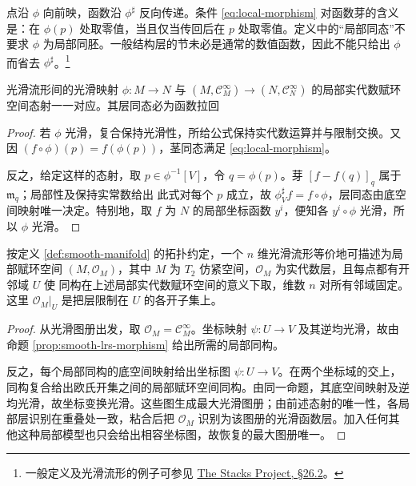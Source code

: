 点沿 $\phi$ 向前映，函数沿 $\phi^\sharp$ 反向传递。条件 \eqref{eq:local-morphism} 对函数芽的含义是：在 $\phi(p)$ 处取零值，当且仅当传回后在 $p$ 处取零值。定义中的“局部同态”不要求 $\phi$ 为局部同胚。一般结构层的节未必是通常的数值函数，因此不能只给出 $\phi$ 而省去 $\phi^\sharp$。\footnote{一般定义及光滑流形的例子可参见 \href{https://stacks.math.columbia.edu/tag/01HA}{The Stacks Project, \S26.2}。}

\begin{proposition}\label{prop:smooth-lrs-morphism}
    光滑流形间的光滑映射 $\phi:M\to N$ 与 $(M,\mathcal C^\infty_M)\to(N,\mathcal C^\infty_N)$ 的局部实代数赋环空间态射一一对应。其层同态必为函数拉回
\end{proposition}
\begin{proof}
    若 $\phi$ 光滑，复合保持光滑性，所给公式保持实代数运算并与限制交换。又因 $(f\circ\phi)(p)=f(\phi(p))$，茎同态满足 \eqref{eq:local-morphism}。

    反之，给定这样的态射，取 $p\in\phi^{-1}[V]$，令 $q=\phi(p)$。芽 $[f-f(q)]_q$ 属于 $\mathfrak m_q$；局部性及保持实常数给出
    此式对每个 $p$ 成立，故 $\phi^\sharp_V f=f\circ\phi$，层同态由底空间映射唯一决定。特别地，取 $f$ 为 $N$ 的局部坐标函数 $y^i$，便知各 $y^i\circ\phi$ 光滑，所以 $\phi$ 光滑。
\end{proof}

\begin{theorem}[光滑流形的层刻画]\label{thm:manifold-lrs}
    按定义 \ref{def:smooth-manifold} 的拓扑约定，一个 $n$ 维光滑流形等价地可描述为局部赋环空间 $(M,\mathcal O_M)$，其中 $M$ 为 $T_2$ 仿紧空间，$\mathcal O_M$ 为实代数层，且每点都有开邻域 $U$ 使
    同构在上述局部实代数赋环空间的意义下取，维数 $n$ 对所有邻域固定。这里 $\mathcal O_M|_U$ 是把层限制在 $U$ 的各开子集上。
\end{theorem}
\begin{proof}
    从光滑图册出发，取 $\mathcal O_M=\mathcal C^\infty_M$。坐标映射 $\psi:U\to V$ 及其逆均光滑，故由命题 \ref{prop:smooth-lrs-morphism} 给出所需的局部同构。

    反之，每个局部同构的底空间映射给出坐标图 $\psi:U\to V$。在两个坐标域的交上，同构复合给出欧氏开集之间的局部赋环空间同构。由同一命题，其底空间映射及逆均光滑，故坐标变换光滑。这些图生成最大光滑图册；由前述态射的唯一性，各局部层识别在重叠处一致，粘合后把 $\mathcal O_M$ 识别为该图册的光滑函数层。加入任何其他这种局部模型也只会给出相容坐标图，故恢复的最大图册唯一。
\end{proof}

